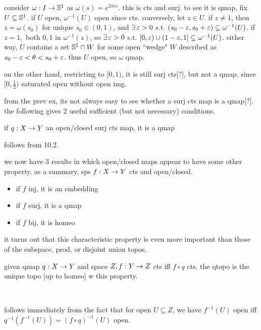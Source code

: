 \newpage
\begin{xmp}[source=Primary Source Material]
    consider $\omega:I\rightarrow\mathbb{S}^{1}$ as $\omega(s)=e^{2\pi is}$. this is cts and
    surj. to see it is qmap, fix $U\subseteq\mathbb{S}^{1}$. if $U$ open,
    $\omega^{-1}(U)$ open since cts. conversely, let $z\in U$. if $z\neq1$, then
    $z=\omega(s_{0})$ for unique $s_{0}\in(0,1)$, and $\exists \, \varepsilon>0$ s.t.
    $(s_{0}-\varepsilon,s_{0}+\varepsilon)\subseteq\omega^{-1}(U)$. if $z=1,$ both $0,1$ in
    $\omega^{-1}(z)$, so $\exists \, \varepsilon>0$ s.t. $[0,\varepsilon)\cup(1-\varepsilon,1]\subseteq
    \omega^{-1}(U)$. either way, $U$ contains a set $\mathbb{S}^{1}\cap W$ for some
    open ``wedge" $W$ described as $s_{0}-\varepsilon<\theta<s_{0}+\varepsilon$. thus $U$ open,
    so $\omega$ qmap.

    on the other hand, restricting to $[0,1)$, it is still surj cts[?], but not
    a qmap, since $[0,\frac{1}{2})$ saturated open without open img.
\end{xmp}

from the prev ex, its not always easy to see whether a surj cts map is a qmap[?].
the following gives 2 useful sufficient (but not necessary) conditions.

\begin{prop}
    if $q:X\rightarrow Y$ an open/closed surj cts map, it is a qmap
\end{prop}
follows from 10.2.

we now have 3 results in which open/closed maps appear to have some other
property. as a summary, sps $f:X\rightarrow Y$ cts and open/closed.
\begin{itemize}
    \item if $f$ inj, it is an embedding
    \item if $f$ surj, it is a qmap
    \item if $f$ bij, it is homeo
\end{itemize}

it turns out that this characteristic property is even more important than
those of the subspace, prod, or disjoint union topos.

\begin{prop}[type=Theorem,title=Characteristic Property of Quotient Spaces]
    given qmap $q:X\rightarrow Y$ and space $Z, f:Y\rightarrow Z$ cts iff $f\circ q$ cts.
    the qtopo is the unique topo [up to homeo] w this property.
\end{prop} \

\begin{pf}[source=Primary Source Material]
    follows immediately from the fact that for open $U\subseteq Z$, we have
    $f^{-1}(U)$ open iff $q^{-1}(f^{-1}(U))=(f\circ q)^{-1}(U)$ open.
\end{pf}

